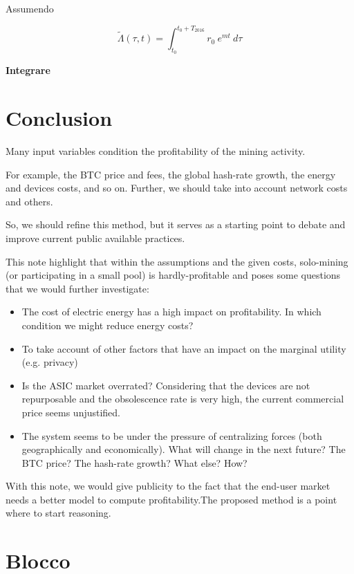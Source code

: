 \documentclass{article}
\begin{document}
Assumendo

\begin{equation}
    \tilde{\Lambda}(\tau, t) = \int_{t_{0}}^{t_{0} + T_{2016}} r_{0} \ e^{m t} \ d\tau
\end{equation}

\textbf{Integrare}

\newpage

\section{Conclusion}

Many input variables condition the profitability of the mining activity.

For example, the BTC price and fees, the global hash-rate growth, the energy and devices costs, and so on. Further, we should take into account network costs and others.

So, we should refine this method, but it serves as a starting point to debate and improve current public available practices.

This note highlight that within the assumptions and the given costs, solo-mining (or participating in a small pool) is hardly-profitable and poses some questions that we would further investigate:


\begin{itemize}
    \item The cost of electric energy has a high impact on profitability. In which condition we might reduce energy costs?
    \item To take account of other factors that have an impact on the marginal utility (e.g. privacy)
    \item Is the ASIC market overrated? Considering that the devices are not repurposable and the obsolescence rate is very high, the current commercial price seems unjustified.
    \item The system seems to be under the pressure of centralizing forces (both geographically and economically). What will change in the next future? The BTC price? The hash-rate growth? What else? How?
\end{itemize}

With this note, we would give publicity to the fact that the end-user market needs a better model to compute profitability.The proposed method is a point where to start reasoning.

\newpage

\appendix

\section{Blocco}
\end{document}
